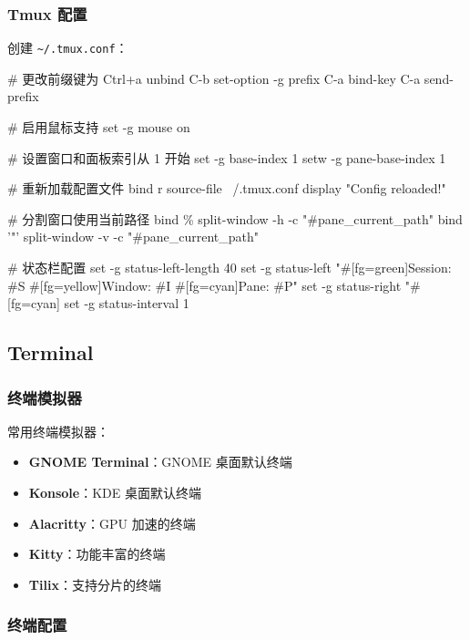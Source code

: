 \subsubsection{Tmux 配置}


创建 \lstinline{~/.tmux.conf}：

\begin{lstcode}[numbers=none]
  # 更改前缀键为 Ctrl+a
  unbind C-b
  set-option -g prefix C-a
  bind-key C-a send-prefix

  # 启用鼠标支持
  set -g mouse on

  # 设置窗口和面板索引从 1 开始
  set -g base-index 1
  setw -g pane-base-index 1

  # 重新加载配置文件
  bind r source-file ~/.tmux.conf \; display "Config reloaded!"

  # 分割窗口使用当前路径
  bind \% split-window -h -c "#{pane_current_path}"
  bind '"' split-window -v -c "#{pane_current_path}"

  # 状态栏配置
  set -g status-left-length 40
  set -g status-left "#[fg=green]Session: #S #[fg=yellow]Window: #I #[fg=cyan]Pane: #P"
  set -g status-right "#[fg=cyan]%
  set -g status-interval 1
\end{lstcode}

\subsection{Terminal}

\subsubsection{终端模拟器}

常用终端模拟器：

\begin{itemize}
  \item \textbf{GNOME Terminal}：GNOME 桌面默认终端
  \item \textbf{Konsole}：KDE 桌面默认终端
  \item \textbf{Alacritty}：GPU 加速的终端
  \item \textbf{Kitty}：功能丰富的终端
  \item \textbf{Tilix}：支持分片的终端
\end{itemize}

\subsubsection{终端配置}

